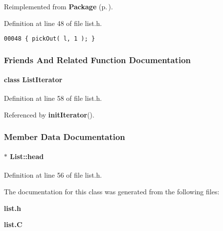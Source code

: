 Reimplemented from {\bf Package} {\rm (p.\,\pageref{Package_a7})}.

Definition at line 48 of file list.h.\small\begin{verbatim}00048 { pickOut( l, 1 ); }
\end{verbatim}\normalsize 


\subsubsection{Friends And Related Function Documentation}
\label{List_l0}
\paragraph{\setlength{\rightskip}{0pt plus 5cm}class List\-Iterator\hspace{0.3cm}{\tt  [friend]}}\hfill



Definition at line 58 of file list.h.

Referenced by {\bf init\-Iterator}().

\subsubsection{Member Data Documentation}
\label{List_o0}
\paragraph{ $\ast$ List::head\hspace{0.3cm}{\tt  [private]}}\hfill



Definition at line 56 of file list.h.

The documentation for this class was generated from the following files:\begin{CompactItemize}
\item 
{\bf list.h}\item 
{\bf list.C}\end{CompactItemize}
